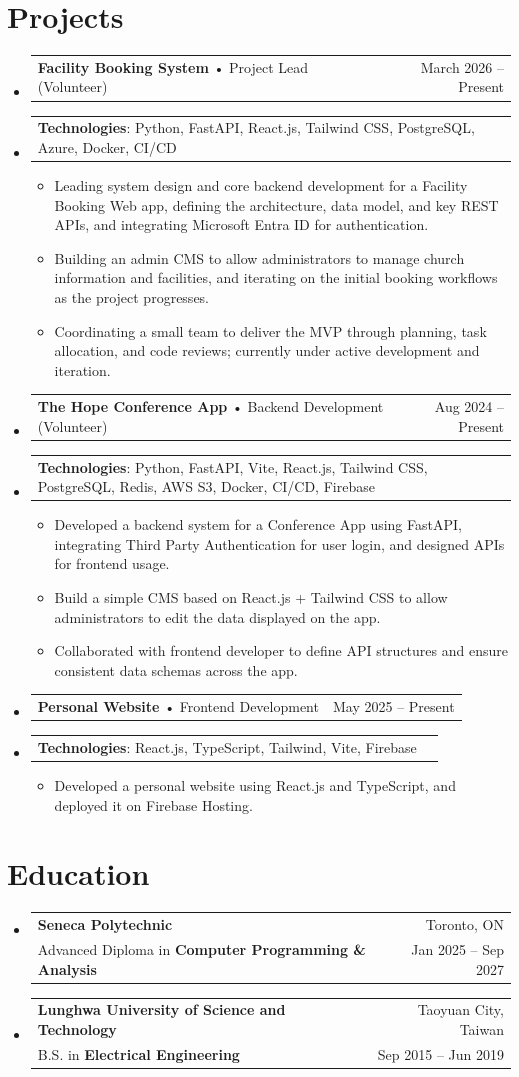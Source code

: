 \documentclass[letterpaper,12pt]{article}
\makeatletter
\newcommand{\resumeItemNH}[1]{
  \item\small{
    {#1 \vspace{-2pt}}
  }
}
\newcommand{\resumeSubheading}[4]{
  \vspace{0pt}\item
    \begin{tabular*}{\textwidth}{l@{\extracolsep{\fill}}r}
      \textbf{#1} & #2 \\
      \small#3 & \small#4 \\
    \end{tabular*}\vspace{-6pt}
}
\newcommand{\resumeProjectHeading}[3]{
  \item
    \begin{tabular*}{\textwidth}{l@{\extracolsep{\fill}}r}
      \textbf{#1} \small• #2 & #3 \\
    \end{tabular*}\vspace{0pt}
}
\newcommand{\resumeProjectTechnologiesItem}[1]{
  \vspace{-16pt}\item
  \begin{tabular*}{\textwidth}{l@{\extracolsep{\fill}}r}
    \textbf{\small Technologies}: \small#1 \\
  \end{tabular*}\vspace{-4pt}
}
\newcommand{\resumeSubHeadingListStart}{\begin{itemize}[leftmargin=0pt,label={}]}
\newcommand{\resumeSubHeadingListEnd}{\end{itemize}}
\newcommand{\resumeItemListStart}{\begin{itemize}[leftmargin=*]}
\newcommand{\resumeItemListEnd}{\end{itemize}}
\makeatother
\begin{document}
\section*{Projects}
  \resumeSubHeadingListStart
    \resumeProjectHeading{Facility Booking System}{Project Lead (Volunteer)}{March 2026 -- Present}
      \resumeProjectTechnologiesItem{Python, FastAPI, React.js, Tailwind CSS, PostgreSQL, Azure, Docker, CI/CD}
      \resumeItemListStart
        \resumeItemNH{Leading system design and core backend development for a Facility Booking Web app, defining the architecture, data model, and key REST APIs, and integrating Microsoft Entra ID for authentication.}
        \resumeItemNH{Building an admin CMS to allow administrators to manage church information and facilities, and iterating on the initial booking workflows as the project progresses.}
        \resumeItemNH{Coordinating a small team to deliver the MVP through planning, task allocation, and code reviews; currently under active development and iteration.}
      \resumeItemListEnd
    \resumeProjectHeading{The Hope Conference App}{Backend Development (Volunteer)}{Aug 2024 -- Present}
      \resumeProjectTechnologiesItem{Python, FastAPI, Vite, React.js, Tailwind CSS, PostgreSQL, Redis, AWS S3, Docker, CI/CD, Firebase}
      \resumeItemListStart
        \resumeItemNH{Developed a backend system for a Conference App using FastAPI, integrating Third Party Authentication for user login, and designed APIs for frontend usage.}
        \resumeItemNH{Build a simple CMS based on React.js + Tailwind CSS to allow administrators to edit the data displayed on the app.}
        \resumeItemNH{Collaborated with frontend developer to define API structures and ensure consistent data schemas across the app.}
      \resumeItemListEnd
    \resumeProjectHeading{Personal Website}{Frontend Development}{May 2025 -- Present}
      \resumeProjectTechnologiesItem{React.js, TypeScript, Tailwind, Vite, Firebase}
      \resumeItemListStart
        \resumeItemNH{Developed a personal website using React.js and TypeScript, and deployed it on Firebase Hosting.}
      \resumeItemListEnd
  \resumeSubHeadingListEnd

\section*{Education}
  \resumeSubHeadingListStart
    \resumeSubheading
      {Seneca Polytechnic}{Toronto, ON}
      {Advanced Diploma in \textbf{Computer Programming \& Analysis}}{Jan 2025 -- Sep 2027}
    \resumeSubheading
      {Lunghwa University of Science and Technology}{Taoyuan City, Taiwan}
      {B.S. in \textbf{Electrical Engineering}}{Sep 2015 -- Jun 2019}
  \resumeSubHeadingListEnd
\end{document}
